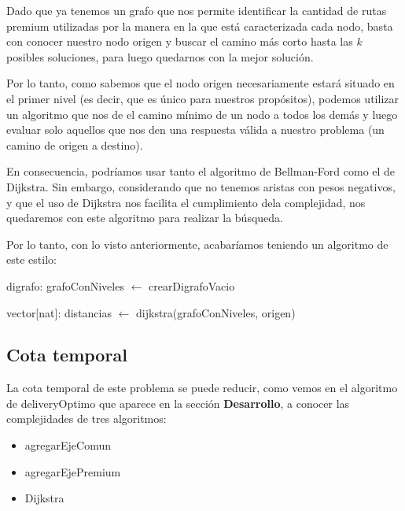 \smallskip

Dado que ya tenemos un grafo que nos permite identificar la cantidad de rutas premium utilizadas por la manera en la que está caracterizada cada nodo, basta con conocer nuestro nodo origen y buscar el camino más corto hasta las $k$ posibles soluciones, para luego quedarnos con la mejor solución.

Por lo tanto, como sabemos que el nodo origen necesariamente estará situado en el primer nivel (es decir, que es único para nuestros propósitos), podemos utilizar un algoritmo que nos de el camino mínimo de un nodo a todos los demás y luego evaluar solo aquellos que nos den una respuesta válida a nuestro problema (un camino de origen a destino).

En consecuencia, podríamos usar tanto el algoritmo de Bellman-Ford como el de Dijkstra. Sin embargo, considerando que no tenemos aristas con pesos negativos, y que el uso de Dijkstra nos facilita el cumplimiento dela complejidad, nos quedaremos con este algoritmo para realizar la búsqueda.

Por lo tanto, con lo visto anteriormente, acabaríamos teniendo un algoritmo de este estilo:

\begin{algorithm}[H]
	\NoCaptionOfAlgo
	\caption{}	
	digrafo: grafoConNiveles $\leftarrow$ crearDigrafoVacio
	

	vector[nat]: distancias $\leftarrow$ dijkstra(grafoConNiveles, origen)
	
\end{algorithm}

\subsection{Cota temporal}
La cota temporal de este problema se puede reducir, como vemos en el algoritmo de deliveryOptimo que aparece en la sección \textbf{Desarrollo}, a conocer las complejidades de tres algoritmos:
\begin{itemize}
	\item agregarEjeComun

	\item agregarEjePremium
	
	\item Dijkstra
\end{itemize}


